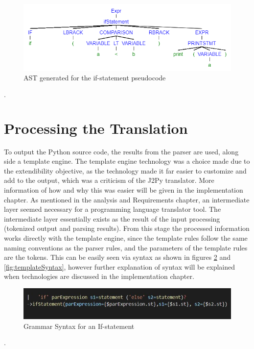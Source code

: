 \documentclass{l4proj}
\begin{document}
\begin{figure}[htb]
    \centering
    \includegraphics[width=1\linewidth]{images/ifStatAST.png}
        \caption{AST generated for the if-statement pseudocode
    }
    \label{fig:ifStatAST} 
\end{figure}.

\section{Processing the Translation}
To output the Python source code, the results from the parser are used, along side a template engine.  The template engine technology was a choice made due to the extendibility objective, as the technology made it far easier to customize and add to the output, which was a criticism of the J2Py translator. More information of how and why this was easier will be given in the implementation chapter. As mentioned in the analysis and Requirements chapter, an intermediate layer seemed necessary for a programming language translator tool. The intermediate layer essentially exists as the result of the input processing (tokenized output and parsing results). From this stage the processed information works directly with the template engine, since the template rules follow the same naming conventions as the parser rules, and the parameters of the template rules are the tokens. This can be easily seen via syntax as shown in figures \ref{fig:grammarSyntax} and \ref{fig:templateSyntax}, however further explanation of syntax will be explained when technologies are discussed in the implementation chapter.

\begin{figure}[htb]
    \centering
    \includegraphics[width=1\linewidth]{images/grammarSyntax.JPG}
        \caption{Grammar Syntax for an If-statement
    }
    \label{fig:grammarSyntax} 
\end{figure}.
\end{document}
